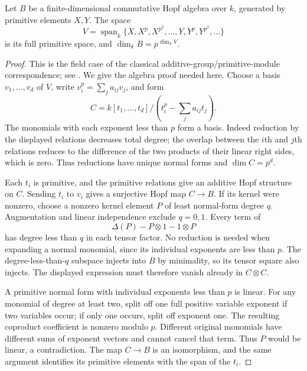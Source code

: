 \begin{lemma}\label{pg-lem:primitives}
Let $B$ be a finite-dimensional commutative Hopf algebra over $k$, generated by primitive elements $X,Y$. The space
\[
 V=\operatorname{span}_k\{X,X^p,X^{p^2},\ldots,Y,Y^p,Y^{p^2},\ldots\}
\]
is its full primitive space, and $\dim_k B=p^{\dim_k V}$.
\end{lemma}
\begin{proof}
This is the field case of the classical additive-group/primitive-module correspondence; see \citet[\S\S2.1--2.2, pp.~3--4]{Koch2015}. We give the algebra proof needed here. Choose a basis $v_1,\ldots,v_d$ of $V$, write $v_i^p=\sum_j a_{ij}v_j$, and form
\[
 C=k[t_1,\ldots,t_d]/(t_i^p-\textstyle\sum_j a_{ij}t_j).
\]
The monomials with each exponent less than $p$ form a basis. Indeed reduction by the displayed relations decreases total degree; the overlap between the $i$th and $j$th relations reduces to the difference of the two products of their linear right sides, which is zero. Thus reductions have unique normal forms and $\dim C=p^d$.

Each $t_i$ is primitive, and the primitive relations give an additive Hopf structure on $C$. Sending $t_i$ to $v_i$ gives a surjective Hopf map $C\to B$. If its kernel were nonzero, choose a nonzero kernel element $P$ of least normal-form degree $q$. Augmentation and linear independence exclude $q=0,1$. Every term of
\[
 \Delta(P)-P\otimes1-1\otimes P
\]
has degree less than $q$ in each tensor factor. No reduction is needed when expanding a normal monomial, since its individual exponents are less than $p$. The degree-less-than-$q$ subspace injects into $B$ by minimality, so its tensor square also injects. The displayed expression must therefore vanish already in $C\otimes C$.

A primitive normal form with individual exponents less than $p$ is linear. For any monomial of degree at least two, split off one full positive variable exponent if two variables occur; if only one occurs, split off exponent one. The resulting coproduct coefficient is nonzero modulo $p$. Different original monomials have different sums of exponent vectors and cannot cancel that term. Thus $P$ would be linear, a contradiction. The map $C\to B$ is an isomorphism, and the same argument identifies its primitive elements with the span of the $t_i$.
\end{proof}

